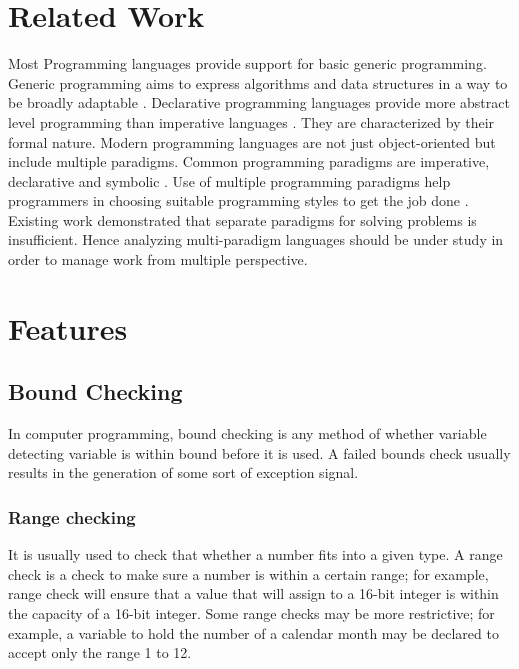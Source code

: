 \documentclass{sig-alternate}
\begin{document}
	\section{Related Work}
	Most Programming languages provide support for basic generic programming. Generic programming aims to express algorithms and data structures in a way to be broadly adaptable \cite{lr5}. Declarative programming languages provide more abstract level programming than imperative languages \cite{lr4}. They are characterized by their formal nature.  Modern programming languages are not just object-oriented but include multiple paradigms. Common programming paradigms are imperative, declarative and symbolic \cite{lr1}. Use of multiple programming paradigms help programmers in choosing suitable programming styles to get the job done \cite{lr2}. Existing work demonstrated that separate paradigms for solving problems is insufficient\cite{WinNT}. Hence analyzing multi-paradigm languages should be under study in order to manage work from multiple perspective. 
	
	\section{Features}
	
	\subsection{Bound Checking}
	In computer programming, bound checking is any method of whether variable detecting variable is within bound before it is used.  A failed bounds check usually results in the generation of some sort of exception signal.
	\subsubsection{Range checking}
	It is usually used to check that whether a number fits into a given type. A range check is a check to make sure a number is within a certain range; for example, range check will ensure that a value that will assign to a 16-bit integer is within the capacity of a 16-bit integer. Some range checks may be more restrictive; for example, a variable to hold the number of a calendar month may be declared to accept only the range 1 to 12.
	
\end{document}
